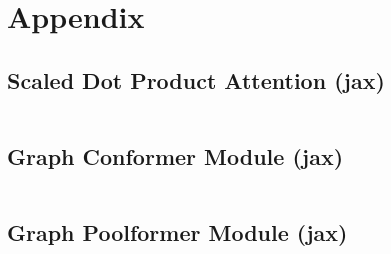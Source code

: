 \chapter{Appendix}
\label{sec:appendix}



\newpage
\section{Scaled Dot Product Attention (jax)} \label{appendix:attention}
    \inputminted[firstline=149, lastline=170]{python}{./../physics-code/models/metaformer.py}

\section{Graph Conformer Module (jax)} \label{appendix:graph-conformer}
    \inputminted[firstline=242, lastline=282]{python}{./../physics-code/models/metaformer.py}

\newpage
\section{Graph Poolformer Module (jax)} \label{appendix:graph-poolformer}
    \inputminted[firstline=212, lastline=239]{python}{./../physics-code/models/metaformer.py}
    
